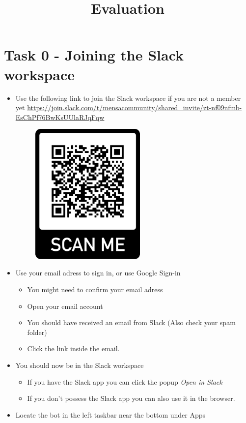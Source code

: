 


\title{Evaluation}



\maketitle

\section*{Task 0 - Joining the Slack workspace}
    
     
\begin{itemize}
    \item Use the following link
    to join the Slack workspace if you are not a member yet
    \url{https://join.slack.com/t/mensacommunity/shared_invite/zt-nf09nfmb-EsChPf76BwKsUUlaRJqFqw}
    \begin{figure}[h]
        \centering
        \includegraphics[height=7cm]{../presentation/frame.png}
    \end{figure}
    \item Use your email adress to sign in, or use Google Sign-in
    \begin{itemize}
    \item You might need to confirm your email adress
    \item Open your email account
    \item You should have received an email from Slack (Also check your spam folder)
    \item  Click the link inside the email. 
    \end{itemize}
    \item You should now be  in the Slack workspace
    \begin{itemize}
        \item If you have the Slack app you can click the popup \emph{Open in Slack}
        \item If you don't possess the Slack app you can also use it in the browser.
    \end{itemize}
    \item Locate the bot in the left taskbar near the bottom under Apps
\end{itemize}

